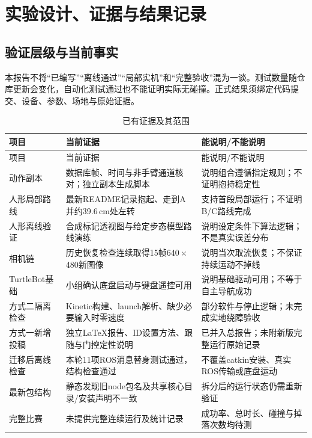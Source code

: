 \section{实验设计、证据与结果记录}\label{sec:experiments}
\subsection{验证层级与当前事实}
本报告不将“已编写”“离线通过”“局部实机”和“完整验收”混为一谈。测试数量随仓库更新会变化，自动化测试通过也不能证明实际无碰撞。正式结果须绑定代码提交、设备、参数、场地与原始证据。
\begin{longtable}{p{32mm}p{54mm}p{51mm}}
\caption{已有证据及其范围}\\\toprule
项目 & 当前证据 & 能说明/不能说明\\\midrule\endfirsthead
\toprule 项目 & 当前证据 & 能说明/不能说明\\\midrule\endhead
动作副本 & 数据库帧、时间与非手臂通道核对；独立副本生成脚本 & 说明组合遵循指定规则；不证明抱持稳定性\\
人形局部路线 & 最新README记录抱起、走到A并约39.6\,cm处左转 & 支持首段局部运行；不证明B/C路线完成\\
人形离线验证 & 合成标记透视图与给定步态模型路线演练 & 说明设定条件下算法逻辑；不是真实误差分布\\
相机链 & 历史恢复检查连续取得15帧640\,$\times$\,480新图像 & 说明当次取流恢复；不保证持续运动不掉线\\
TurtleBot基础 & 小组确认底盘启动与键盘遥控可用 & 说明基础驱动可用；不等于自主导航成功\\
方式二隔离检查 & Kinetic构建、launch解析、缺少必要输入时零速度 & 部分软件与停止逻辑；未完成实地绕障验收\\
方式一新增投稿 & 独立LaTeX报告、ID设置方法、跟随与门控定性说明 & 已并入总报告；未附新版完整运行原始记录\\
迁移后离线检查 & 本轮11项ROS消息替身测试通过，结构检查通过 & 不覆盖catkin安装、真实ROS传输或底盘运动\\
最新包结构 & 静态发现旧node包名及共享核心目录/安装声明不一致 & 拆分后的运行状态仍需重新验证\\
完整比赛 & 未提供完整连续运行及统计记录 & 成功率、总时长、碰撞与掉落次数均待测\\\bottomrule
\end{longtable}

